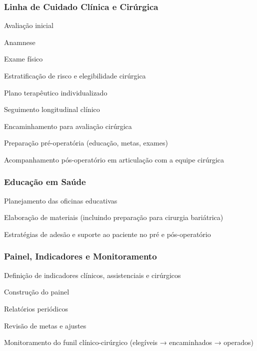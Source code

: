 \documentclass[12pt]{article}
\begin{document}
\subsubsection{Linha de Cuidado Clínica e Cirúrgica}
\label{sec:orgf545bff}
\begin{hlevelthree}
\item Avaliação inicial
\begin{hbullet}
\item Anamnese
\item Exame físico
\item Estratificação de risco e elegibilidade cirúrgica
\end{hbullet}
\item Plano terapêutico individualizado
\item Seguimento longitudinal clínico
\item Encaminhamento para avaliação cirúrgica
\item Preparação pré-operatória (educação, metas, exames)
\item Acompanhamento pós-operatório em articulação com a equipe cirúrgica
\end{hlevelthree}

\subsubsection{Educação em Saúde}
\label{sec:org3355bcf}
\begin{hlevelthree}
\item Planejamento das oficinas educativas
\item Elaboração de materiais (incluindo preparação para cirurgia bariátrica)
\item Estratégias de adesão e suporte ao paciente no pré e pós-operatório
\end{hlevelthree}

\subsubsection{Painel, Indicadores e Monitoramento}
\label{sec:org373e8a2}
\begin{hlevelthree}
\item Definição de indicadores clínicos, assistenciais e cirúrgicos
\item Construção do painel
\item Relatórios periódicos
\item Revisão de metas e ajustes
\item Monitoramento do funil clínico-cirúrgico (elegíveis → encaminhados → operados)
\end{hlevelthree}
\end{document}
